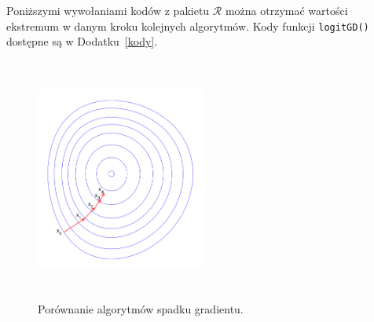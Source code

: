 \newpage
Poniższymi wywołaniami kodów z pakietu $\mathcal{R}$ \cite{programikr} można otrzymać wartości ekstremum w danym kroku kolejnych algorytmów. Kody funkcji \texttt{logitGD()} dostępne są w Dodatku~\ref{kody}.
\begin{Shaded}
\begin{Highlighting}[]
 \NormalTok{, } \NormalTok{(-}\NormalTok{,}\NormalTok{),}
        \NormalTok{/}
 \NormalTok{,}
         \NormalTok{(}\NormalTok{, -}
\NormalTok{(mtcars$vs[}\NormalTok{(}\NormalTok{(mtcars))],}
        \NormalTok{mtcars$mpg[}\NormalTok{(}\NormalTok{(mtcars))],}
         \NormalTok{, }\NormalTok{, } \NormalTok{(}\NormalTok{,}\NormalTok{),}
        \NormalTok{/}
\end{Highlighting}
\end{Shaded}


\begin{figure}[h]
\begin{center}
\includegraphics[width=0.5\textwidth, height=8cm]{Obrazki/gd}
\caption{Porównanie algorytmów spadku gradientu.}
\end{center}
\end{figure}

